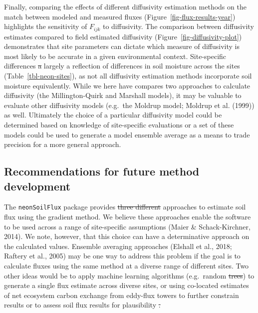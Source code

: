 \documentclass[
  letterpaper,
  DIV=11,
  numbers=noendperiod]{scrartcl}
\providecommand{\DIFadd}[1]{{\protect\color{blue}\uwave{#1}}} %
\providecommand{\DIFdel}[1]{{\protect\color{red}\sout{#1}}}                      %
\providecommand{\DIFaddbegin}{} %
\providecommand{\DIFaddend}{} %
\providecommand{\DIFdelbegin}{} %
\providecommand{\DIFdelend}{} %
\newcommand{\DIFscaledelfig}{0.5}
\newlength{\DIFdelgraphicswidth} %
\newlength{\DIFdelgraphicsheight} %
\newcommand{\DIFaddincludegraphics}[2][]{{\color{blue}\fbox{\DIFOincludegraphics[#1]{#2}}}} %
\newcommand{\DIFdelincludegraphics}[2][]{%
\sbox{\DIFdelgraphicsbox}{\DIFOincludegraphics[#1]{#2}}%
\settoboxwidth{\DIFdelgraphicswidth}{\DIFdelgraphicsbox} %
\settoboxtotalheight{\DIFdelgraphicsheight}{\DIFdelgraphicsbox} %
\scalebox{\DIFscaledelfig}{%
\parbox[b]{\DIFdelgraphicswidth}{\usebox{\DIFdelgraphicsbox}\\[-\baselineskip] \rule{\DIFdelgraphicswidth}{0em}}\llap{\resizebox{\DIFdelgraphicswidth}{\DIFdelgraphicsheight}{%
\setlength{\unitlength}{\DIFdelgraphicswidth}%
\begin{picture}(1,1)%
\thicklines\linethickness{2pt} %
{\color[rgb]{1,0,0}\put(0,0){\framebox(1,1){}}}%
{\color[rgb]{1,0,0}\put(0,0){\line( 1,1){1}}}%
{\color[rgb]{1,0,0}\put(0,1){\line(1,-1){1}}}%
\end{picture}%
}\hspace*{3pt}}} %
} %
\DeclareRobustCommand{\DIFaddbegin}{\DIFOaddbegin \let\includegraphics\DIFaddincludegraphics} %
\DeclareRobustCommand{\DIFaddend}{\DIFOaddend \let\includegraphics\DIFOincludegraphics} %
\DeclareRobustCommand{\DIFdelbegin}{\DIFOdelbegin \let\includegraphics\DIFdelincludegraphics} %
\DeclareRobustCommand{\DIFdelend}{\DIFOaddend \let\includegraphics\DIFOincludegraphics} %
\begin{document}
Finally, comparing the effects of different diffusivity estimation
methods on the match between modeled and measured fluxes
(Figure~\ref{fig-flux-results-year}) highlights the sensitivity of
\(F_{ijk}\) to diffusivity. The comparison between diffusivity estimates
compared to field estimated diffusivity
(Figure~\ref{fig-diffusivity-plot}) demonstrates that site parameters
can dictate which measure of diffusivity is most likely to be accurate
in a given environmental context. Site-specific differences \DIFdelbegin \DIFdel{a }\DIFdelend \DIFaddbegin \DIFadd{are }\DIFaddend largely
a reflection of differences in soil moisture across the sites
(Table~\ref{tbl-neon-sites}), as not all diffusivity estimation methods
incorporate soil moisture equivalently. While we here have compares two
approaches to calculate diffusivity (the Millington-Quirk and Marshall
models), it may be valuable to evaluate other diffusivity models
(e.g.~the Moldrup model; Moldrup et al. (1999)) as well. Ultimately the
choice of a particular diffusivity model could be determined based on
knowledge of site-specific evaluations or a set of these models could be
used to generate a model ensemble average as a means to trade precision
for a more general approach.

\subsection{Recommendations for future method
development}\label{recommendations-for-future-method-development}

The \texttt{neonSoilFlux} package provides \DIFdelbegin \DIFdel{three different }\DIFdelend \DIFaddbegin \DIFadd{several }\DIFaddend approaches to
estimate soil flux using the gradient method. We believe these
approaches enable the software to be used across a range of
site-specific assumptions (Maier \& Schack-Kirchner, 2014). We note,
however, that this choice can have a determinative approach on the
calculated values. Ensemble averaging approaches (Elshall et al., 2018;
Raftery et al., 2005) may be one way to address this problem if the goal
is to calculate fluxes using the same method at a diverse range of
different sites. Two other ideas would be to apply machine learning
algorithms (e.g.~random \DIFdelbegin \DIFdel{trees}\DIFdelend \DIFaddbegin \DIFadd{forest}\DIFaddend ) to generate a single flux estimate
across diverse sites, or using co-located estimates of net ecosystem
carbon exchange from eddy-flux towers to further constrain results or to
assess soil flux results for plausibility \DIFdelbegin \DIFdel{.
}\DIFdelend \DIFaddbegin \DIFadd{(Phillips et al., 2017).
}\DIFaddend 
\end{document}
